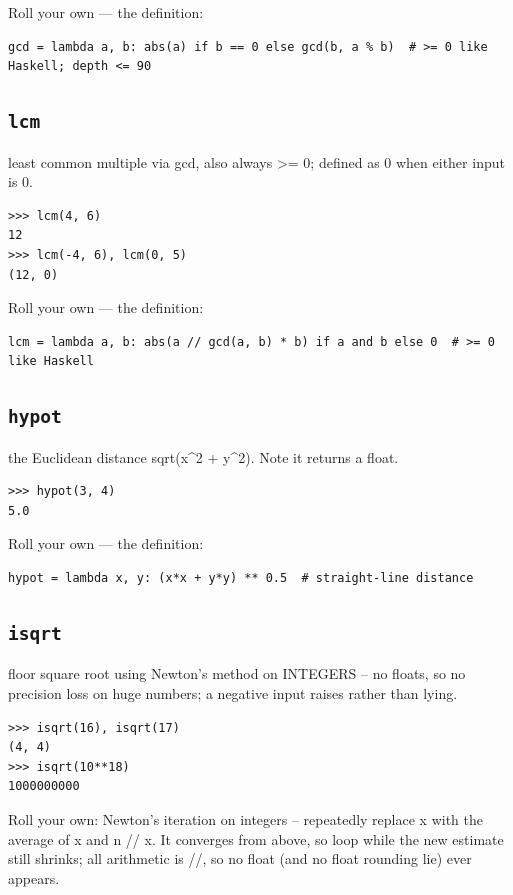 \documentclass[10pt,letterpaper]{book}
\begin{document}
Roll your own --- the definition:

\begin{lstlisting}[style=ex]
gcd = lambda a, b: abs(a) if b == 0 else gcd(b, a % b)  # >= 0 like Haskell; depth <= 90
\end{lstlisting}
\subsection{\texttt{lcm}}\label{def:lcm}
least common multiple via gcd, also always >= 0; defined as 0 when either input is 0.
\begin{lstlisting}[style=ex]
>>> lcm(4, 6)
12
>>> lcm(-4, 6), lcm(0, 5)
(12, 0)
\end{lstlisting}

Roll your own --- the definition:

\begin{lstlisting}[style=ex]
lcm = lambda a, b: abs(a // gcd(a, b) * b) if a and b else 0  # >= 0 like Haskell
\end{lstlisting}
\subsection{\texttt{hypot}}\label{def:hypot}
the Euclidean distance sqrt(x\^{}2 + y\^{}2). Note it returns a float.
\begin{lstlisting}[style=ex]
>>> hypot(3, 4)
5.0
\end{lstlisting}

Roll your own --- the definition:

\begin{lstlisting}[style=ex]
hypot = lambda x, y: (x*x + y*y) ** 0.5  # straight-line distance
\end{lstlisting}
\subsection{\texttt{isqrt}}\label{def:isqrt}
floor square root using Newton's method on INTEGERS -- no floats, so no precision loss on huge numbers; a negative input raises rather than lying.
\begin{lstlisting}[style=ex]
>>> isqrt(16), isqrt(17)
(4, 4)
>>> isqrt(10**18)
1000000000
\end{lstlisting}

Roll your own: Newton's iteration on integers -- repeatedly replace x with the average of x and n // x. It converges from above, so loop while the new estimate still shrinks; all arithmetic is //, so no float (and no float rounding lie) ever appears.
\end{document}
